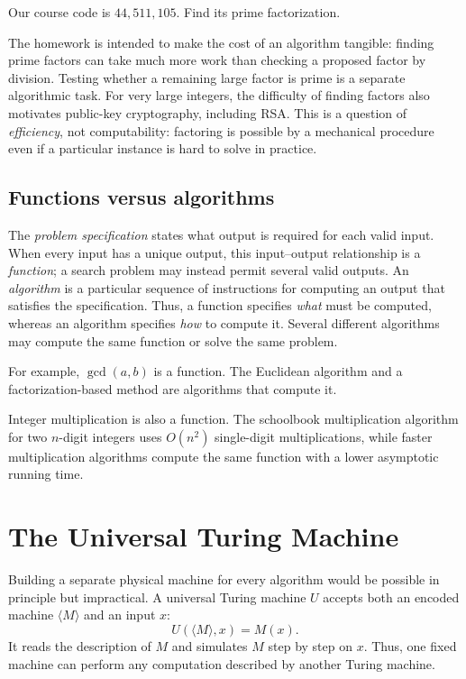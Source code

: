 \documentclass[11pt]{article}
\begin{document}
\begin{conceptcheck}[Homework]
Our course code is $44{,}511{,}105$. Find its prime factorization.
\end{conceptcheck}

The homework is intended to make the cost of an algorithm tangible: finding
prime factors can take much more work than checking a proposed factor by
division. Testing whether a remaining large factor is prime is a separate
algorithmic task. For very large integers, the difficulty of finding factors
also motivates public-key cryptography, including RSA. This is a question of
\emph{efficiency}, not computability: factoring is possible by a mechanical
procedure even if a particular instance is hard to solve in practice.

\subsection{Functions versus algorithms}

\begin{definition}
The \emph{problem specification} states what output is required for each valid
input. When every input has a unique output, this input--output relationship is
a \emph{function}; a search problem may instead permit several valid outputs.
An \emph{algorithm} is a particular sequence of instructions for computing an
output that satisfies the specification. Thus, a function specifies \emph{what}
must be computed, whereas an algorithm specifies \emph{how} to compute it.
Several different algorithms may compute the same function or solve the same
problem.
\end{definition}

For example, $\gcd(a,b)$ is a function. The Euclidean algorithm and a
factorization-based method are algorithms that compute it.

Integer multiplication is also a function. The schoolbook multiplication
algorithm for two $n$-digit integers uses $O(n^2)$ single-digit multiplications,
while faster multiplication algorithms compute the same function with a lower
asymptotic running time.

\section{The Universal Turing Machine}

Building a separate physical machine for every algorithm would be possible in principle but impractical. A universal Turing machine $U$ accepts both an encoded machine $\langle M\rangle$ and an input $x$:
\[
  U(\langle M\rangle,x)=M(x).
\]
It reads the description of $M$ and simulates $M$ step by step on $x$. Thus, one fixed machine can perform any computation described by another Turing machine.
\end{document}
